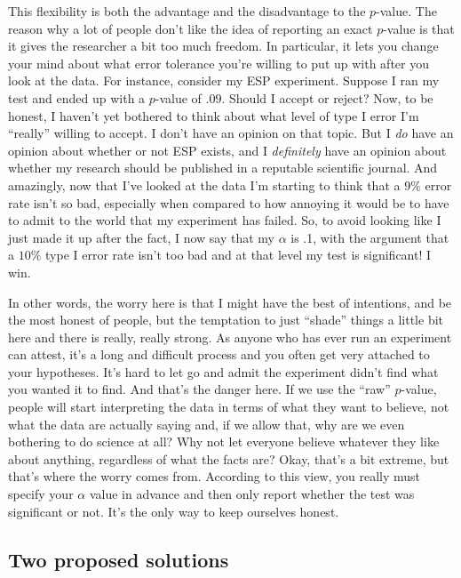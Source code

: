 \documentclass[
  a4paper,
]{book}
\begin{document}
This flexibility is both the advantage and the disadvantage to the
\(p\)-value. The reason why a lot of people don't like the idea of
reporting an exact \(p\)-value is that it gives the researcher a bit too
much freedom. In particular, it lets you change your mind about what
error tolerance you're willing to put up with after you look at the
data. For instance, consider my ESP experiment. Suppose I ran my test
and ended up with a \(p\)-value of \(.09\). Should I accept or reject?
Now, to be honest, I haven't yet bothered to think about what level of
type I error I'm ``really'' willing to accept. I don't have an opinion
on that topic. But I \emph{do} have an opinion about whether or not ESP
exists, and I \emph{definitely} have an opinion about whether my
research should be published in a reputable scientific journal. And
amazingly, now that I've looked at the data I'm starting to think that a
\(9\%\) error rate isn't so bad, especially when compared to how
annoying it would be to have to admit to the world that my experiment
has failed. So, to avoid looking like I just made it up after the fact,
I now say that my \(\alpha\) is .1, with the argument that a \(10\%\)
type I error rate isn't too bad and at that level my test is
significant! I win.

In other words, the worry here is that I might have the best of
intentions, and be the most honest of people, but the temptation to just
``shade'' things a little bit here and there is really, really strong.
As anyone who has ever run an experiment can attest, it's a long and
difficult process and you often get very attached to your hypotheses.
It's hard to let go and admit the experiment didn't find what you wanted
it to find. And that's the danger here. If we use the ``raw''
\(p\)-value, people will start interpreting the data in terms of what
they want to believe, not what the data are actually saying and, if we
allow that, why are we even bothering to do science at all? Why not let
everyone believe whatever they like about anything, regardless of what
the facts are? Okay, that's a bit extreme, but that's where the worry
comes from. According to this view, you really must specify your
\(\alpha\) value in advance and then only report whether the test was
significant or not. It's the only way to keep ourselves honest.

\subsection{Two proposed solutions}\label{two-proposed-solutions}
\end{document}
